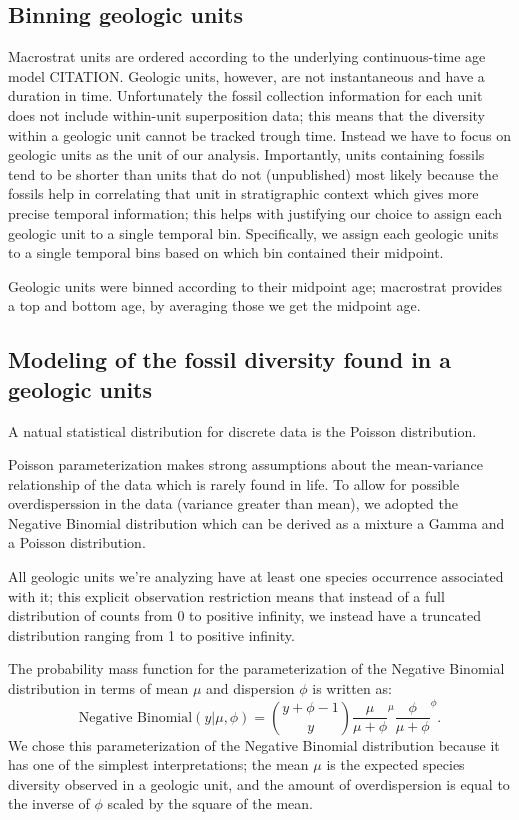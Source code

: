\documentclass[12pt,letterpaper]{article}
\begin{document}
\subsection{Binning geologic units}

Macrostrat units are ordered according to the underlying continuous-time age model CITATION. Geologic units, however, are not instantaneous and have a duration in time. Unfortunately the fossil collection information for each unit does not include within-unit superposition data; this means that the diversity within a geologic unit cannot be tracked trough time. Instead we have to focus on geologic units as the unit of our analysis. Importantly, units containing fossils tend to be shorter than units that do not (unpublished) most likely because the fossils help in correlating that unit in stratigraphic context which gives more precise temporal information; this helps with justifying our choice to assign each geologic unit to a single temporal bin. Specifically, we assign each geologic units to a single temporal bins based on which bin contained their midpoint. 

Geologic units were binned according to their midpoint age; macrostrat provides a top and bottom age, by averaging those we get the midpoint age.


\subsection{Modeling of the fossil diversity found in a geologic units}

A natual statistical distribution for discrete data is the Poisson distribution. 

Poisson parameterization makes strong assumptions about the mean-variance relationship of the data which is rarely found in life. To allow for possible overdisperssion in the data (variance greater than mean), we adopted the Negative Binomial distribution which can be derived as a mixture a Gamma and a Poisson distribution.

All geologic units we're analyzing have at least one species occurrence associated with it; this explicit observation restriction means that instead of a full distribution of counts from 0 to positive infinity, we instead have a truncated distribution ranging from 1 to positive infinity.

The probability mass function for the parameterization of the Negative Binomial distribution in terms of mean \(\mu\) and dispersion \(\phi\) is written as:
\begin{equation}
  \text{Negative Binomial}(y | \mu, \phi) = \binom{y + \phi - 1}{y} \frac{\mu}{\mu + \phi}^{\mu} \frac{\phi}{\mu + \phi}^{\phi}.
\end{equation}
We chose this parameterization of the Negative Binomial distribution because it has one of the simplest interpretations; the mean \(\mu\) is the expected species diversity observed in a geologic unit, and the amount of overdispersion is equal to the inverse of \(\phi\) scaled by the square of the mean. 
\end{document}
